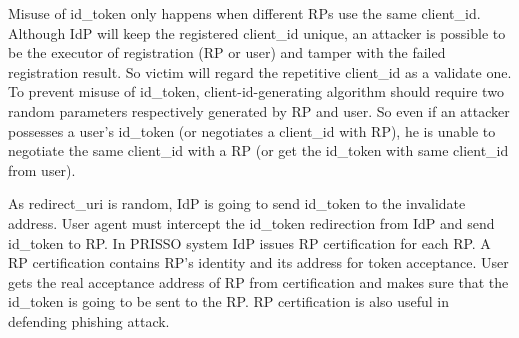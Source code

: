 Misuse of id\_token only happens when different RPs use the same client\_id. Although IdP will keep the registered client\_id unique, an attacker is possible to be the executor of registration (RP or user) and tamper with the failed registration result. So victim will regard the repetitive client\_id as a validate one. To prevent misuse of id\_token, client-id-generating algorithm should require two random parameters respectively generated by RP and user. So even if an attacker possesses a user's id\_token (or negotiates a client\_id with RP), he is unable to negotiate the same client\_id with a RP (or get the id\_token with same client\_id from user). 

As redirect\_uri is random, IdP is going to send id\_token to the invalidate address. User agent must intercept the id\_token redirection from IdP and send id\_token to RP. In PRISSO system IdP issues RP certification for each RP. A RP certification contains RP's identity and its address for token acceptance.  User gets the real acceptance address of RP from certification and makes sure that the id\_token is going to be sent to the RP. RP certification is also useful in defending phishing attack.
 
